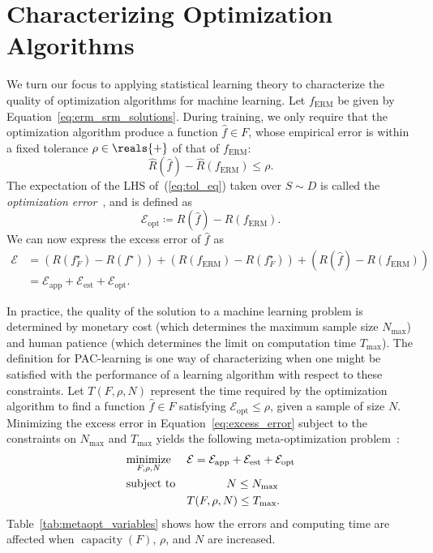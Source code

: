 \documentclass[11pt,a4paper]{article}
\numberwithin{equation}{section}
\newcommand{\capacity}{\operatorname{capacity}}
\newcommand{\apperr}{\mathcal{E}_{\mathrm{app}}}
\newcommand{\esterr}{\mathcal{E}_{\mathrm{est}}}
\newcommand{\opterr}{\mathcal{E}_{\mathrm{opt}}}
\begin{document}
\section{Characterizing Optimization Algorithms}

We turn our focus to applying statistical learning theory to characterize the
quality of optimization algorithms for machine learning. Let $f_{\text{ERM}}$ be
given by Equation~\ref{eq:erm_srm_solutions}. During training, we only require
that the optimization algorithm produce a function $\hat{f} \in F$, whose
empirical error is within a fixed tolerance $\rho \in \reals{+}$ of that of
$f_{\text{ERM}}$:
\begin{equation}
	\hat{R}(\hat{f}) - \hat{R}(f_{\text{ERM}}) \leq \rho.
	\label{eq:tol_eq}
\end{equation}
The expectation of the LHS of~(\ref{eq:tol_eq}) taken over $S \sim D$ is called
the \emph{optimization error}~\citep{bousquet2008tradeoffs}, and is defined as
\[
	\opterr \coloneqq R(\hat{f}) - R(f_{\text{ERM}}).
\]
We can now express the excess error of $\hat{f}$ as
\begin{align}
	\mathcal{E}
	&= (R(f_F^\star) - R(f^\star)) + (R(f_{\text{ERM}}) - R(f_F^\star)) +
		(R(\hat{f}) - R(f_{\text{ERM}})) \\
	&= \apperr + \esterr + \opterr.
	\label{eq:excess_error}
\end{align}

In practice, the quality of the solution to a machine learning problem is
determined by monetary cost (which determines the maximum sample size
$N_{\text{max}}$) and human patience (which determines the limit on
computation time $T_{\text{max}}$). The definition for PAC-learning is one way
of characterizing when one might be satisfied with the performance of a learning
algorithm with respect to these constraints. Let $T(F, \rho, N)$ represent the
time required by the optimization algorithm to find a function $\hat{f} \in F$
satisfying $\opterr \leq \rho$, given a sample of size $N$. Minimizing the
excess error in Equation~\ref{eq:excess_error} subject to the constraints on
$N_{\text{max}}$ and $T_{\text{max}}$ yields the following meta-optimization
problem~\citep{bousquet2008tradeoffs}:
\begin{equation}
\begin{aligned}
	& \underset{F, \rho, N}{\text{minimize}} & &
		\mathcal{E} = \apperr + \esterr + \opterr \\
	& \text{subject to} & & \hspace{3.5em} N \leq N_{\text{max}} \\
	& & & T(F, \rho, N) \leq T_{\text{max}}.
\end{aligned}
\label{eq:metaopt_program}
\end{equation}
Table~\ref{tab:metaopt_variables} shows how the errors and computing time are
affected when $\capacity(F)$, $\rho$, and $N$ are increased.
\end{document}
